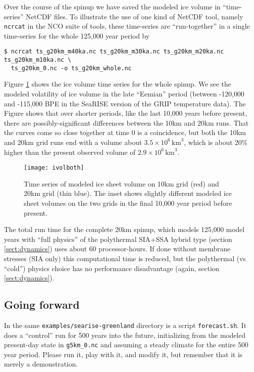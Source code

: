 Over the course of the spinup we have saved the modeled ice volume in ``time-series'' NetCDF files.  To illustrate the use of one kind of NetCDF tool, namely \verb|ncrcat| in the NCO suite of tools, these time-series are ``run-together'' in a single time-series for the whole 125,000 year period by
\begin{verbatim}
$ ncrcat ts_g20km_m40ka.nc ts_g20km_m30ka.nc ts_g20km_m20ka.nc ts_g20km_m10ka.nc \
  ts_g20km_0.nc -o ts_g20km_whole.nc
\end{verbatim}
\noindent Figure \ref{fig:sr-spindone-ivolboth} shows the ice volume time series for the whole spinup.  We see the modeled volatility of ice volume in the late ``Eemian'' period (between -120,000 and -115,000 BPE in the SeaRISE version of the GRIP temperature data).  The Figure shows that over shorter periods, like the last 10,000 years before present, there are possibly-significant differences between the 10km and 20km runs.  That the curves come so close together at time 0 is a coincidence, but both the 10km and 20km grid runs end with a volume about $3.5 \times 10^6\,\text{km}^3$, which is about 20\% higher than the present observed volume of $2.9 \times 10^6\,\text{km}^3$.

\begin{figure}[ht]
\centering
\texttt{[image: ivolboth]}
\caption{Time series of modeled ice sheet volume on 10km grid (red) and 20km grid (thin blue).  The inset shows slightly different modeled ice sheet volumes on the two grids in the final 10,000 year period before present.}
\label{fig:sr-spindone-ivolboth}
\end{figure}

The total run time for the complete 20km spinup, which models 125,000 model years with ``full physics'' of the polythermal SIA+SSA hybrid type (section \ref{sect:dynamics}) uses about 60 processor-hours.  If done without membrane stresses (SIA only) this computational time is reduced, but the polythermal (vs ``cold'') physics choice has no performance disadvantage (again, section \ref{sect:dynamics}).


\subsection{Going forward}  \label{subsect:forecastcaution}  In the same \verb|examples/searise-greenland| directory is a script \verb|forecast.sh|.  It does a ``control'' run for 500 years into the future, initializing from the modeled present-day state in \verb|g5km_0.nc| and assuming a steady climate for the entire 500 year period.  Please run it, play with it, and modify it, but remember that it is merely a demonstration.

